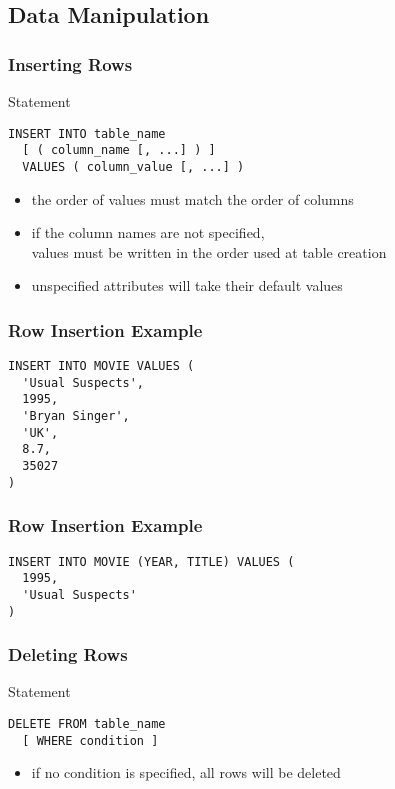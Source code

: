 \documentclass[dvipsnames]{beamer}
\theoremstyle{plain}
\begin{document}
\subsection{Data Manipulation}

\begin{frame}[fragile]
  \frametitle{Inserting Rows}

  \begin{block}{Statement}
    \begin{lstlisting}
INSERT INTO table_name
  [ ( column_name [, ...] ) ]
  VALUES ( column_value [, ...] )
    \end{lstlisting}
  \end{block}

  \pause
  \begin{itemize}
    \item the order of values must match the order of columns
    \item if the column names are not specified,\\
      values must be written in the order used at table creation
    \item unspecified attributes will take their default values
  \end{itemize}
\end{frame}

\begin{frame}[fragile]
  \frametitle{Row Insertion Example}

  \begin{example}
    \begin{lstlisting}
INSERT INTO MOVIE VALUES (
  'Usual Suspects',
  1995,
  'Bryan Singer',
  'UK',
  8.7,
  35027
)
    \end{lstlisting}
  \end{example}
\end{frame}

\begin{frame}[fragile]
  \frametitle{Row Insertion Example}

  \begin{example}
    \begin{lstlisting}
INSERT INTO MOVIE (YEAR, TITLE) VALUES (
  1995,
  'Usual Suspects'
)
    \end{lstlisting}
  \end{example}
\end{frame}

\begin{frame}[fragile]
  \frametitle{Deleting Rows}

  \begin{block}{Statement}
    \begin{lstlisting}
DELETE FROM table_name
  [ WHERE condition ]
    \end{lstlisting}
  \end{block}

  \pause
  \begin{itemize}
    \item if no condition is specified, all rows will be deleted
  \end{itemize}
\end{frame}
\end{document}
